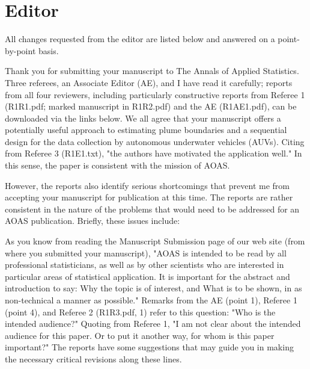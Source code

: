 \documentclass[a4paper]{article}
\newcounter{reviewer}
\begin{document}
\section*{Editor}
All changes requested from the editor are listed below and answered on a point-by-point basis.

	
\vspace{5mm}

Thank you for submitting your manuscript to The Annals of 
Applied Statistics.  Three referees, an Associate Editor (AE),
and I have read it carefully; reports from all four reviewers,
including particularly constructive reports from Referee 1
(R1R1.pdf; marked manuscript in R1R2.pdf) and the AE (R1AE1.pdf), 
can be downloaded via the links below. We all agree that your 
manuscript offers a potentially useful approach to estimating 
plume boundaries and a sequential design for the data collection
by autonomous underwater vehicles (AUVs). Citing from Referee 3
(R1E1.txt), "the authors have motivated the application well."
In this sense, the paper is consistent with the mission of AOAS.

However, the reports also identify serious shortcomings that 
prevent me from accepting your manuscript for publication at
this time. The reports are rather consistent in the nature of 
the problems that would need to be addressed for an AOAS publication.  
Briefly, these issues include:

\vspace{5mm}

As you know from reading the Manuscript Submission page of our
web site (from where you submitted your manuscript), "AOAS is 
intended to be read by all professional statisticians, as well 
as by other scientists who are interested in particular areas 
of statistical application. It is important for the abstract
and introduction to say: Why the topic is of interest, and What 
is to be shown, in as non-technical a manner as possible."
Remarks from the AE (point 1), Referee 1 (point 4), and Referee 2 
(R1R3.pdf, 1) refer to this question: "Who is the intended
audience?"  Quoting from Referee 1, "I am not clear about the 
intended audience for this paper.  Or to put it another way, 
for whom is this paper important?" The reports have some 
suggestions that may guide you in making the necessary critical 
revisions along these lines.  
\end{document}
